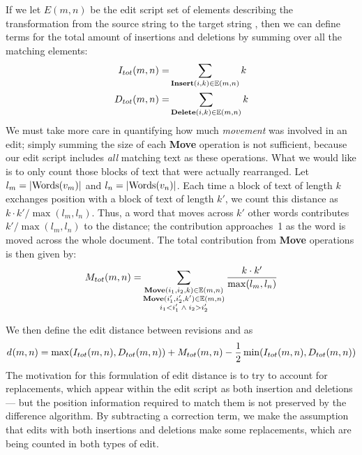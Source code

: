 If we let $E(m,n)$ be the edit script set of elements describing the
transformation from the source string 
to the target string ,
then we can define terms for the total amount of insertions and
deletions by summing over all the matching elements:
\begin{align*}
  I_{tot}(m,n) =& \sum_{\mathbf{Insert}(i, k) \in \authorrevs{m, n}} k \\
  D_{tot}(m,n) =& \sum_{\mathbf{Delete}(i, k) \in \authorrevs{m, n}} k \\
\end{align*}
%
We must take more care in quantifying how much \textit{movement}
was involved in an edit; simply summing the size of each
\textbf{Move} operation is not sufficient, because our edit script
includes \textit{all} matching text as these operations.
What we would like is to only count those blocks of text that
were actually rearranged.
Let $l_m = | \mathrm{Words}(v_{m}) |$ and $l_n = | \mathrm{Words}(v_{n}) |$.
Each time a block of text of length $k$ exchanges position
with a block of text of length $k'$, we count this distance
as $k \cdot k' / \max(l_m, l_n)$.
Thus, a word that moves across $k'$ other words contributes
$k' / \max(l_m, l_n)$ to the distance; the contribution
approaches~1 as the word is moved across the whole document.
The total contribution from \textbf{Move} operations is
then given by:
%
\begin{align*}
  M_{tot}(m,n) =& \sum_{\substack{
        \mathbf{Move}(i_1, i_2, k) \in \authorrevs{m, n} \\
        \mathbf{Move}(i'_1, i'_2, k') \in \authorrevs{m, n} \\
        i_1 < i'_1 \;\And\; i_2 > i'_2
        }} \frac{k \cdot k'}{\max(l_m, l_n)} \\
\end{align*}

We then define the edit distance between revisions
 and  as
\begin{equation}
    \dist{}{m,n} = \max(I_{tot}(m,n), D_{tot}(m,n))
        + M_{tot}(m,n)
        - \frac{1}{2}\min(I_{tot}(m,n), D_{tot}(m,n)) \\
\label{eq:dist}
\end{equation}
The motivation for this formulation of edit distance is
to try to account for replacements, which appear within
the edit script as both insertion and deletions --- but the
position information required to match them is not preserved
by the difference algorithm.
By subtracting a correction term, we make the assumption
that edits with both insertions and deletions make some
replacements, which are being counted in both types of edit.

